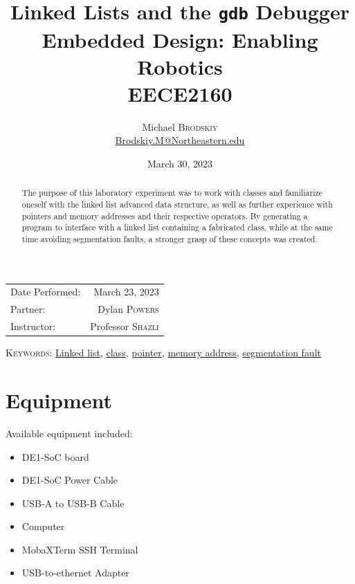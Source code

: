 \documentclass[
	letterpaper, %
	10pt, %
]{CSUniSchoolLabReport}
\title{Linked Lists and the \texttt{gdb} Debugger\\ Embedded Design: Enabling Robotics \\ EECE2160} %
\author{Michael \textsc{Brodskiy}\\ \small \href{mailto:Brodskiy.M@Northeastern.edu}{Brodskiy.M@Northeastern.edu}}
\date{March 30, 2023} %
\begin{document}
\maketitle %

\begin{center}
	\begin{tabular}{l r}
		Date Performed: & March 23, 2023 \\ %
        Partner: & Dylan \textsc{Powers} \\ %
		Instructor: & Professor \textsc{Shazli} %
	\end{tabular}
\end{center}

\newpage

\begin{abstract}

  The purpose of this laboratory experiment was to work with classes and familiarize oneself with the linked list advanced data structure, as well as further experience with pointers and memory addresses and their respective operators. By generating a program to interface with a linked list containing a fabricated class, while at the same time avoiding segmentation faults, a stronger grasp of these concepts was created.

\end{abstract}

\begin{flushleft}

  \textsc{Keywords:} \underline{Linked list}, \underline{class}, \underline{pointer}, \underline{memory address}, \underline{segmentation fault}

\end{flushleft}

\newpage

\section{Equipment}

\hspace{.5 in} Available equipment included:\\

\begin{itemize}

  \item DE1-SoC board

  \item DE1-SoC Power Cable

  \item USB-A to USB-B Cable

  \item Computer

  \item MobaXTerm SSH Terminal

  \item USB-to-ethernet Adapter

\end{itemize}
\end{document}
